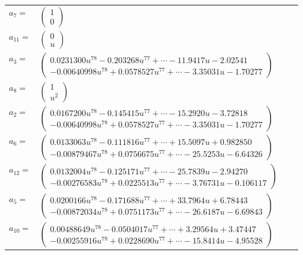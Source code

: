 \documentclass[1p]{elsarticle_modified}
\theoremstyle{definition}
\begin{document}
\begin{tabular}{m{7pt} m{180pt} m{7pt} m{180pt} }
\flushright $a_{7}=$&$\begin{pmatrix}1\\0\end{pmatrix}$ \\
\flushright $a_{11}=$&$\begin{pmatrix}0\\u\end{pmatrix}$ \\
\flushright $a_{3}=$&$\begin{pmatrix}0.0231300 u^{78}-0.203268 u^{77}+\cdots-11.9417 u-2.02541\\-0.00640998 u^{78}+0.0578527 u^{77}+\cdots-3.35031 u-1.70277\end{pmatrix}$ \\
\flushright $a_{8}=$&$\begin{pmatrix}1\\u^2\end{pmatrix}$ \\
\flushright $a_{2}=$&$\begin{pmatrix}0.0167200 u^{78}-0.145415 u^{77}+\cdots-15.2920 u-3.72818\\-0.00640998 u^{78}+0.0578527 u^{77}+\cdots-3.35031 u-1.70277\end{pmatrix}$ \\
\flushright $a_{6}=$&$\begin{pmatrix}0.0133063 u^{78}-0.111816 u^{77}+\cdots+15.5097 u+0.982850\\-0.00879467 u^{78}+0.0756675 u^{77}+\cdots-25.5253 u-6.64326\end{pmatrix}$ \\
\flushright $a_{12}=$&$\begin{pmatrix}0.0132004 u^{78}-0.125171 u^{77}+\cdots-25.7839 u-2.94270\\-0.00276583 u^{78}+0.0225513 u^{77}+\cdots-3.76731 u-0.106117\end{pmatrix}$ \\
\flushright $a_{5}=$&$\begin{pmatrix}0.0200166 u^{78}-0.171688 u^{77}+\cdots+33.7964 u+6.78443\\-0.00872034 u^{78}+0.0751173 u^{77}+\cdots-26.6187 u-6.69843\end{pmatrix}$ \\
\flushright $a_{10}=$&$\begin{pmatrix}0.00488649 u^{78}-0.0504017 u^{77}+\cdots+3.29564 u+3.47447\\-0.00255916 u^{78}+0.0228690 u^{77}+\cdots-15.8414 u-4.95528\end{pmatrix}$ \\

\end{tabular}
\end{document}
